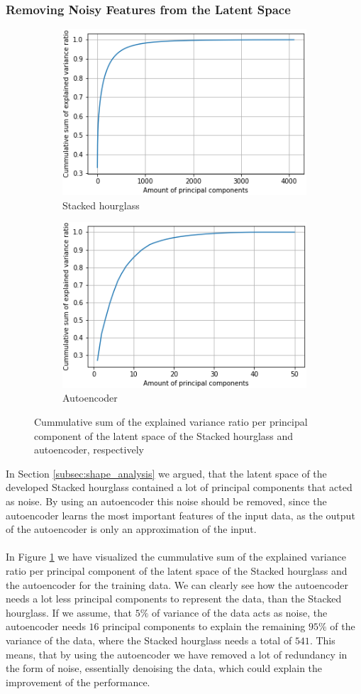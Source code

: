 \documentclass[./main.tex]{subfiles}
\begin{document}
\subsubsection{Removing Noisy Features from the Latent Space}
\begin{figure}[htbp]
    \centering
    \begin{subfigure}{7 cm}
        \centering
        \includegraphics[width = 7 cm]{entities/SHG_pca_var_dist.png}
        \caption{Stacked hourglass}
    \end{subfigure}
    \begin{subfigure}{7 cm}
        \centering
        \includegraphics[width = 7 cm]{entities/SHG_AE_pca_var_dist.png}
        \caption{Autoencoder}
    \end{subfigure}
    \caption{Cummulative sum of the explained variance ratio per principal component of the latent space of the Stacked hourglass and autoencoder, respectively}
    \label{fig:sum_cum_distributions}
\end{figure}
\noindent In Section \ref{subsec:shape_analysis} we argued, that the latent space of the developed Stacked hourglass contained a lot of principal components that acted as noise. By using an autoencoder this noise should be removed, since the autoencoder learns the most important features of the input data, as the output of the autoencoder is only an approximation of the input.
\\
\\
In Figure \ref{fig:sum_cum_distributions} we have visualized the cummulative sum of the explained variance ratio per principal component of the latent space of the Stacked hourglass and the autoencoder for the training data. We can clearly see how the autoencoder needs a lot less principal components to represent the data, than the Stacked hourglass. If we assume, that $5\%$ of variance of the data acts as noise, the autoencoder needs $16$ principal components to explain the remaining $95\%$ of the variance of the data, where the Stacked hourglass needs a total of $541$. This means, that by using the autoencoder we have removed a lot of redundancy in the form of noise, essentially denoising the data, which could explain the improvement of the performance.
\end{document}
